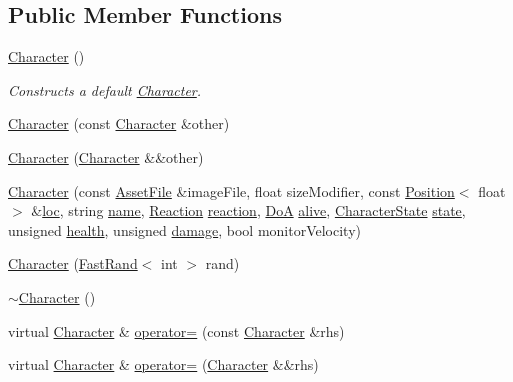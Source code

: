 \subsection*{Public Member Functions}
\begin{DoxyCompactItemize}
\item 
\hyperlink{class_character_adc27bdd255876169bad2ed0bae0cffb5}{Character} ()
\begin{DoxyCompactList}\small\item\em Constructs a default \hyperlink{class_character}{Character}. \end{DoxyCompactList}\item 
\hyperlink{class_character_a0eac14bff9a793857bb2a86a2c0fcf9c}{Character} (const \hyperlink{class_character}{Character} \&other)
\item 
\hyperlink{class_character_a90171e1a0ff378b3bbe125f85b4ecfdb}{Character} (\hyperlink{class_character}{Character} \&\&other)
\item 
\hyperlink{class_character_a71ddaf9372427d6bacf3b6aa0116cecf}{Character} (const \hyperlink{struct_asset_file}{Asset\-File} \&image\-File, float size\-Modifier, const \hyperlink{struct_position}{Position}$<$ float $>$ \&\hyperlink{class_game_object_a6858e668e7d2c5ded850b952aaacd905}{loc}, string \hyperlink{class_character_a2d423654566d1bf2160fef74bf04cc84}{name}, \hyperlink{_character_data_8h_a0e5ce1612c1e71823c97a9cd734de339}{Reaction} \hyperlink{class_character_a579933775b2e4e97465bacb09c4e87f5}{reaction}, \hyperlink{_character_data_8h_acbff4d7298e294294555d39178aad448}{Do\-A} \hyperlink{class_character_ac83b99be690bb41b7fae53e9457838c6}{alive}, \hyperlink{_character_data_8h_aacbb008a93d24b04a8779bbdbd8880b5}{Character\-State} \hyperlink{class_character_ac20f1ebda238017ddc245ecdce827037}{state}, unsigned \hyperlink{class_character_ae8c0d82624dc3a171e2c3b42c699151e}{health}, unsigned \hyperlink{class_character_ae6a140637ffe5004179d90a0e04a411b}{damage}, bool monitor\-Velocity)
\item 
\hyperlink{class_character_aa9363d80872be14d29b006745ff0b58a}{Character} (\hyperlink{class_fast_rand}{Fast\-Rand}$<$ int $>$ rand)
\item 
\hyperlink{class_character_a9e9be564d05ded80962b2045aa70b3fc}{$\sim$\-Character} ()
\item 
virtual \hyperlink{class_character}{Character} \& \hyperlink{class_character_acdb4f61692995622e350cbfbb0c4d8c6}{operator=} (const \hyperlink{class_character}{Character} \&rhs)
\item 
virtual \hyperlink{class_character}{Character} \& \hyperlink{class_character_a0c0f1e362dabc8877889e49185afd43e}{operator=} (\hyperlink{class_character}{Character} \&\&rhs)

\end{DoxyCompactItemize}
